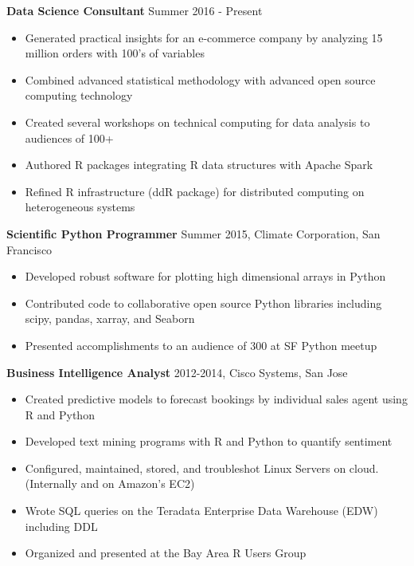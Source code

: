 \documentclass{article}
\begin{document}
\begin{description}

\item  \textbf{Data Science Consultant} 
    \hspace{.5cm} 
    Summer 2016 - Present
  
\begin{itemize}
\item Generated practical insights for an e-commerce company by
    analyzing 15 million orders with 100's of variables
\item Combined advanced statistical methodology with advanced open source
    computing technology
\item Created several workshops on technical computing
    for data analysis to audiences of 100+
\item Authored R packages integrating R data structures with Apache Spark
\item Refined R infrastructure (ddR package) for distributed computing on
    heterogeneous systems
\end{itemize}

\item  \textbf{Scientific Python Programmer} 
    \hspace{.5cm} 
    Summer 2015, Climate Corporation, San Francisco
  
\begin{itemize}
\item Developed robust software for plotting high dimensional arrays in
    Python
\item Contributed code to collaborative open source Python libraries including
    scipy, pandas, xarray, and Seaborn
\item Presented accomplishments to an audience of 300 at SF Python meetup
\end{itemize}

\item  \textbf{Business Intelligence Analyst} 
    \hspace{.5cm} 
    2012-2014, Cisco Systems, San Jose
  
\begin{itemize}
\item Created predictive models to forecast bookings by individual sales agent using R and Python
\item Developed text mining programs with R and Python to quantify sentiment
\item Configured, maintained, stored, and troubleshot Linux Servers on cloud. (Internally and on Amazon's EC2)
\item Wrote SQL queries on the Teradata Enterprise Data Warehouse (EDW) including DDL
\item Organized and presented at the Bay Area R Users Group
\end{itemize}

\end{description}
\end{document}

